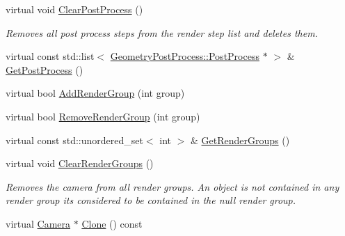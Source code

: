 \begin{DoxyCompactItemize}
virtual void \mbox{\hyperlink{class_geometry_engine_1_1_geometry_world_item_1_1_geometry_camera_1_1_camera_a97e992ac9c5429aebca4797f5e545e46}{Clear\+Post\+Process}} ()
\begin{DoxyCompactList}\small\item\em Removes all post process steps from the render step list and deletes them. \end{DoxyCompactList}\item 
virtual const std\+::list$<$ \mbox{\hyperlink{class_geometry_engine_1_1_geometry_post_process_1_1_post_process}{Geometry\+Post\+Process\+::\+Post\+Process}} $\ast$ $>$ \& \mbox{\hyperlink{class_geometry_engine_1_1_geometry_world_item_1_1_geometry_camera_1_1_camera_a1ef9d25c964f8686f3da5594e0184d58}{Get\+Post\+Process}} ()
\item 
virtual bool \mbox{\hyperlink{class_geometry_engine_1_1_geometry_world_item_1_1_geometry_camera_1_1_camera_a0a76192f4a629a8b6f7a1900078869de}{Add\+Render\+Group}} (int group)
\item 
virtual bool \mbox{\hyperlink{class_geometry_engine_1_1_geometry_world_item_1_1_geometry_camera_1_1_camera_aea364f3b5f2aecabcb240825988d6bee}{Remove\+Render\+Group}} (int group)
\item 
virtual const std\+::unordered\+\_\+set$<$ int $>$ \& \mbox{\hyperlink{class_geometry_engine_1_1_geometry_world_item_1_1_geometry_camera_1_1_camera_ab61fd806095dfb39141289e7b7d25dab}{Get\+Render\+Groups}} ()
\item 
\mbox{\label{class_geometry_engine_1_1_geometry_world_item_1_1_geometry_camera_1_1_camera_ad8e59031794a9fd3f84458828942f2c9}} 
virtual void \mbox{\hyperlink{class_geometry_engine_1_1_geometry_world_item_1_1_geometry_camera_1_1_camera_ad8e59031794a9fd3f84458828942f2c9}{Clear\+Render\+Groups}} ()
\begin{DoxyCompactList}\small\item\em Removes the camera from all render groups. An object is not contained in any render group it\textquotesingle{}s considered to be contained in the null render group. \end{DoxyCompactList}\item 
virtual \mbox{\hyperlink{class_geometry_engine_1_1_geometry_world_item_1_1_geometry_camera_1_1_camera}{Camera}} $\ast$ \mbox{\hyperlink{class_geometry_engine_1_1_geometry_world_item_1_1_geometry_camera_1_1_camera_a53b37943c1929fde7396c66a36fb3c52}{Clone}} () const
\end{DoxyCompactItemize}
